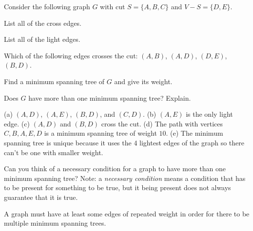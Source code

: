 \begin{requ}
Consider the following graph $G$ with cut $S=\{A,B,C\}$
and $V-S=\{D,E\}$.


\begin{lenum}
\item List all of the cross edges.
\item List all of the light edges.
\item Which of the following edges crosses the cut:
$(A,B)$, $(A,D)$, $(D,E)$, $(B,D)$.
\item Find a minimum spanning tree of $G$ and give its weight.
\item Does $G$ have more than one minimum spanning tree? Explain.
\end{lenum}
\begin{requanswer}
(a) $(A,D)$, $(A,E)$, $(B,D)$, and $(C,D)$.
(b) $(A,E)$ is the only light edge.
(c) $(A,D)$ and $(B,D)$ cross the cut.
(d) The path with vertices $C, B, A, E, D$ is a minimum spanning tree
of weight $10$.
(e) The minimum spanning tree is unique because it uses the 4 
lightest edges of the graph so there can't be one with smaller weight.
\end{requanswer}
\end{requ}

\begin{requ}
Can you think of a necessary condition for a graph to 
have more than one minimum spanning tree?
Note: a {\em necessary condition} means a condition 
that has to be present for something to be true, but it being
present does not always guarantee that it is true.
\begin{requanswer}
A graph must have at least some edges of repeated weight
in order for there to be multiple minimum spanning trees.
\end{requanswer}
\end{requ}

